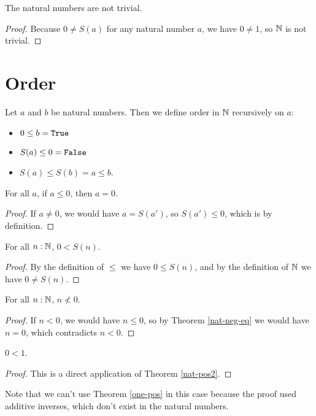\documentclass[../math.tex]{subfiles}
\begin{document}
\begin{instance}
    The natural numbers are not trivial.
\end{instance}
\begin{proof}
    Because $0 \neq S(a)$ for any natural number $a$, we have $0 \neq 1$, so
    $\mathbb{N}$ is not trivial.
\end{proof}

\section{Order}

\begin{instance}
    Let $a$ and $b$ be natural numbers.  Then we define order in $\mathbb{N}$
    recursively on $a$:
    \begin{itemize}
        \item $0 \leq b = \vtt{True}$
        \item $S(a) \leq 0 = \vtt{False}$
        \item $S(a) \leq S(b) = a \leq b$.
    \end{itemize}
\end{instance}

\begin{theorem} \label{nat-neg-eq}
    For all $a$, if $a \leq 0$, then $a = 0$.
\end{theorem}
\begin{proof}
    If $a \neq 0$, we would have $a = S(a')$, so $S(a') \leq 0$, which is
     by definition.
\end{proof}

\begin{theorem} \label{nat-pos2}
    For all $n : \mathbb{N}$, $0 < S(n)$.
\end{theorem}
\begin{proof}
    By the definition of $\leq$ we have $0 \leq S(n)$, and by the definition of
    $\mathbb{N}$ we have $0 \neq S(n)$.
\end{proof}

\begin{theorem} \label{nat-neg2}
    For all $n : \mathbb{N}$, $n \nless 0$.
\end{theorem}
\begin{proof}
    If $n < 0$, we would have $n \leq 0$, so by Theorem \ref{nat-neg-eq} we
    would have $n = 0$, which contradicts $n < 0$.
\end{proof}

\begin{theorem}
    $0 < 1$.
\end{theorem}
\begin{proof}
    This is a direct application of Theorem \ref{nat-pos2}.
\end{proof}
\noindent Note that we can't use Theorem \ref{one-pos} in this case because the
proof used additive inverses, which don't exist in the natural numbers.
\end{document}
